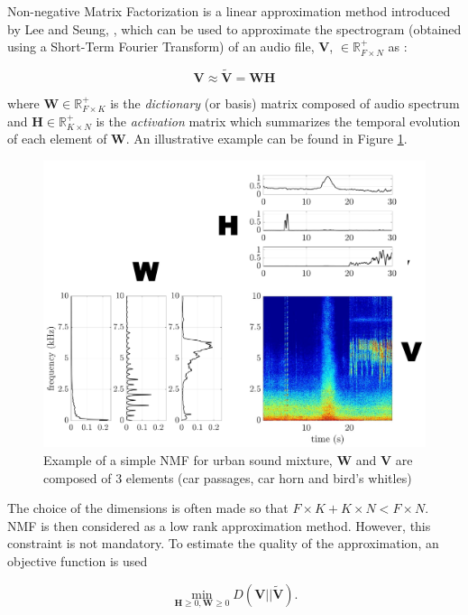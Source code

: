 \documentclass[twocolumn,a4paper,10pt]{article}
\begin{document}
Non-negative Matrix Factorization is a linear approximation method introduced by Lee and Seung, \cite{lee_learning_1999}, which can be used to approximate the spectrogram (obtained using a Short-Term Fourier Transform) of an audio file, $\mathbf{V}$, $\in \mathbb{R}^+_{F \times N}$ as :

\begin{equation}\label{eq:nmf}
\mathbf{V} \approx \mathbf{\tilde{V}} = \mathbf{WH}
\end{equation}

where $\mathbf{W} \in \mathbb{R}^+_{F \times K}$ is the \textit{dictionary} (or basis) matrix composed of audio spectrum and $\mathbf{H} \in \mathbb{R}^+_{K \times N}$ is the \textit{activation} matrix which summarizes the temporal evolution of each element of $\mathbf{W}$. An illustrative example can be found in Figure  \ref{fig:example_NMF}.

\begin{figure}[t]
\centering
\includegraphics[width=0.9\linewidth]{figures/schema_introduction_nmf.pdf}
\caption{Example of a simple NMF  for urban sound mixture, $\mathbf{W}$ and $\mathbf{V}$ are composed of 3 elements (car passages, car horn and bird's whitles)}
\label{fig:example_NMF}
\end{figure}

The choice of the dimensions is often made so that $F\times K + K \times N < F \times N$. NMF is then considered as a low rank approximation method. However, this constraint is not mandatory. To estimate the quality of the approximation, an objective function is used

\begin{equation}\label{eq:min-D-WH}
\underset{\mathbf{H} \geq 0, \mathbf{W} \geq 0}{\min} D\left(\mathbf{V} \vert \vert \mathbf{\tilde{V}}\right).
\end{equation}
\end{document}
